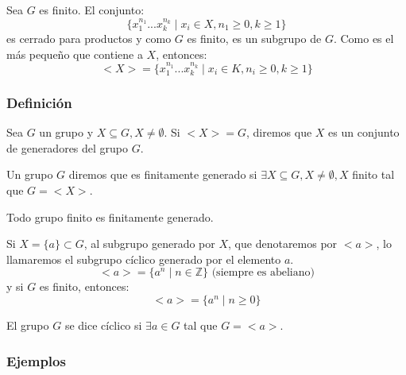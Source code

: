 \documentclass[11pt,a4paper]{article}
\begin{document}
Sea $G$ es finito. El conjunto:
$$\{x_{1}^{n_{1}} ... x_{k}^{n_{k}} \mid x_{i} \in X, n_{1} \geq 0, k \geq 1\}$$
es cerrado para productos y como $G$ es finito, es un subgrupo de $G$. Como es el más pequeño que contiene a $X$, entonces:
$$<X> = \{x_{1}^{n_{1}} ... x_{k}^{n_{k}} \mid x_{i} \in K, n_{i} \geq 0, k \geq 1\}$$

\subsubsection*{Definición}

Sea $G$ un grupo y $X \subseteq G, X \neq \emptyset$. Si $<X> = G$, diremos que $X$ es un conjunto de generadores del grupo $G$.

Un grupo $G$ diremos que es finitamente generado si $\exists X \subseteq G, X \neq \emptyset, X$ finito tal que $G = <X>$.

Todo grupo finito es finitamente generado.

Si $X = \{a\} \subset G$, al subgrupo generado por $X$, que denotaremos por $<a>$, lo llamaremos el subgrupo cíclico generado por el elemento $a$.
$$<a> = \{a^{n} \mid n \in \mathbb{Z}\} \text{ (siempre es abeliano)}$$
y si $G$ es finito, entonces:
$$<a> = \{a^{n} \mid n \geq 0 \}$$

El grupo $G$ se dice cíclico si $\exists a \in G$ tal que $G = <a>$.

\subsubsection*{Ejemplos}
\end{document}
